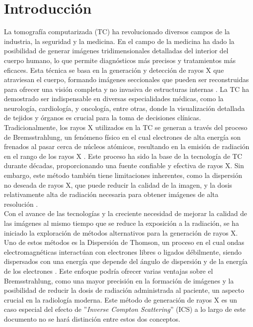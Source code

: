 \vspace*{\fill}


\section{Introducción}



La tomografía computarizada (TC) ha revolucionado diversos campos de la industria, la seguridad y la medicina. En el campo de la medicina ha dado la posibilidad de generar imágenes tridimensionales detalladas del interior del cuerpo humano, lo que permite diagnósticos más precisos y tratamientos más eficaces. Esta técnica se basa en la generación y detección de rayos X que atraviesan el cuerpo, formando imágenes seccionales que pueden ser reconstruidas para ofrecer una visión completa y no invasiva de estructuras internas \cite{herman2009fundamentals}. La TC ha demostrado ser indispensable en diversas especialidades médicas, como la neurología, cardiología, y oncología, entre otras, donde la visualización detallada de tejidos y órganos es crucial para la toma de decisiones clínicas. \\

Tradicionalmente, los rayos X utilizados en la TC se generan a través del proceso de Bremsstrahlung, un fenómeno físico en el cual electrones de alta energía son frenados al pasar cerca de núcleos atómicos, resultando en la emisión de radiación en el rango de los rayos X \cite{griffiths2021introduction}. Este proceso ha sido la base de la tecnología de TC durante décadas, proporcionando una fuente confiable y efectiva de rayos X. Sin embargo, este método también tiene limitaciones inherentes, como la dispersión no deseada de rayos X, que puede reducir la calidad de la imagen, y la dosis relativamente alta de radiación necesaria para obtener imágenes de alta resolución \cite{herman2009fundamentals}. \\

Con el avance de las tecnologías y la creciente necesidad de mejorar la calidad de las imágenes al mismo tiempo que se reduce la exposición a la radiación, se ha iniciado la exploración de métodos alternativos para la generación de rayos X. Uno de estos métodos es la Dispersión de Thomson, un proceso en el cual ondas electromagnéticas interactúan con electrones libres o ligados débilmente, siendo dispersados con una energía que depende del ángulo de dispersión y de la energía de los electrones \cite{rykovanov2014quasi}. Este enfoque podría ofrecer varias ventajas sobre el Bremsstrahlung, como una mayor precisión en la formación de imágenes y la posibilidad de reducir la dosis de radiación administrada al paciente, un aspecto crucial en la radiología moderna. Este método de generación de rayos X es un caso especial del efecto de ''\emph{Inverse Compton Scattering}'' (ICS) a lo largo de este documento no se hará distinción entre estos dos conceptos. \\

